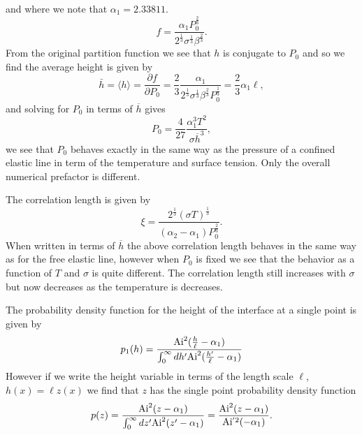 and where we note that $\alpha_1 = 2.33811$.
\begin{equation}
f= \frac{\alpha_1 P_0^\frac{2}{3}}{2^\frac{1}{3} \sigma^\frac{1}{3}\beta^\frac{2}{3}}.
\end{equation}
From the original partition function we see that $h$ is conjugate to $P_0$ and so we find the average height is given by
\begin{equation}
\bar h= \langle h\rangle = \frac{\partial f}{\partial P_0} = \frac{2}{3}\frac{\alpha_1 }{2^\frac{1}{3} \sigma^\frac{1}{3}\beta^\frac{2}{3}P_0^\frac{1}{3}} = \frac{2}{3}\alpha_1\ell,\label{h1}
\end{equation}
and solving for $P_0$ in terms of $\overline h$ gives
\begin{equation}
P_0 = \frac{4}{27}\frac{\alpha_1^3 T^2}{\sigma \overline h^3},
\end{equation}
we see that $P_0$ behaves exactly in the same way as the pressure of a confined elastic line
in term of the temperature and surface tension. Only the overall numerical prefactor is different.

The correlation length is given by
\begin{equation}
\xi = \frac{2^\frac{1}{3}(\sigma T)^\frac{1}{3}}{(\alpha_2-\alpha_1)P_0^\frac{2}{3}}.
\end{equation}
When written in terms of $\overline h$ the above correlation length behaves in the same way
as for the free elastic line, however when $P_0$ is fixed we see that the behavior as a function 
of $T$ and $\sigma$ is quite different. The correlation length still increases with $\sigma$ but now decreases as the temperature is decreases.

The probability density function for the height of the interface at a single point is given
by
\begin{equation}
p_1(h) = \frac{{\rm Ai}^2(\frac{h}{\ell}-\alpha_1)}{\int_0^\infty dh' {\rm Ai}^2(\frac{h'}{\ell}-\alpha_1)}
\end{equation}
However if we write the height variable in terms of the length scale $\ell$, $h(x)= \ell z(x)$ we find that $z$ has the single point probability density function
\begin{equation}
p(z)= \frac{{\rm Ai}^2(z-\alpha_1)}{\int_0^\infty dz' {\rm Ai}^2(z'-\alpha_1)}
=\frac{{\rm Ai}^2(z-\alpha_1)}{{\rm Ai}{^{'2}}(-\alpha_1)}
\label{airyprob}.
\end{equation}


